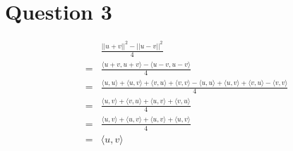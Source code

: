 \section*{Question 3}
\begin{eqnarray*}
  & & \frac{||u + v||^2 - ||u - v||^2}{4} \\
  &=& \frac{\langle u + v, u + v \rangle - \langle u - v, u - v \rangle}{4} \\
  &=& \frac{\langle u, u \rangle + \langle u, v \rangle + \langle v,u \rangle + \langle v, v \rangle - \langle u, u \rangle + \langle u, v \rangle + \langle v, u \rangle - \langle v, v \rangle}{4} \\
  &=& \frac{\langle u, v \rangle + \langle v, u \rangle + \langle u, v \rangle + \langle v, u \rangle}{4} \\
  &=& \frac{\langle u, v \rangle + \langle u, v \rangle + \langle u, v \rangle + \langle u, v \rangle}{4} \\
  &=& \langle u, v \rangle
\end{eqnarray*}